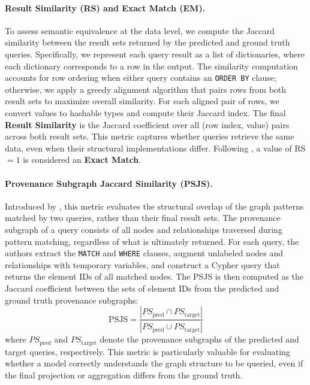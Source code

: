 \paragraph{Result Similarity (RS) and Exact Match (EM).} To assess semantic equivalence at the data level, we compute the Jaccard similarity between the result sets returned by the predicted and ground truth queries. Specifically, we represent each query result as a list of dictionaries, where each dictionary corresponds to a row in the output. The similarity computation accounts for row ordering when either query contains an \texttt{ORDER BY} clause; otherwise, we apply a greedy alignment algorithm that pairs rows from both result sets to maximize overall similarity. For each aligned pair of rows, we convert values to hashable types and compute their Jaccard index. The final \textbf{Result Similarity} is the Jaccard coefficient over all (row index, value) pairs across both result sets. This metric captures whether queries retrieve the same data, even when their structural implementations differ. Following \cite{neo4jlabs-text2cypher-2024}, a value of RS $= 1$ is considered an \textbf{Exact Match}.

\paragraph{Provenance Subgraph Jaccard Similarity (PSJS).} Introduced by \cite{cypherbench-megagonlabs-2024}, this metric evaluates the structural overlap of the graph patterns matched by two queries, rather than their final result sets. The provenance subgraph of a query consists of all nodes and relationships traversed during pattern matching, regardless of what is ultimately returned. For each query, the authors \cite{cypherbench-megagonlabs-2024} extract the \texttt{MATCH} and \texttt{WHERE} clauses, augment unlabeled nodes and relationships with temporary variables, and construct a Cypher query that returns the element IDs of all matched nodes. The PSJS is then computed as the Jaccard coefficient between the sets of element IDs from the predicted and ground truth provenance subgraphs:
\[
\text{PSJS} = \frac{|PS_{\text{pred}} \cap PS_{\text{target}}|}{|PS_{\text{pred}} \cup PS_{\text{target}}|}
\]
where $PS_{\text{pred}}$ and $PS_{\text{target}}$ denote the provenance subgraphs of the predicted and target queries, respectively. This metric is particularly valuable for evaluating whether a model correctly understands the graph structure to be queried, even if the final projection or aggregation differs from the ground truth.

